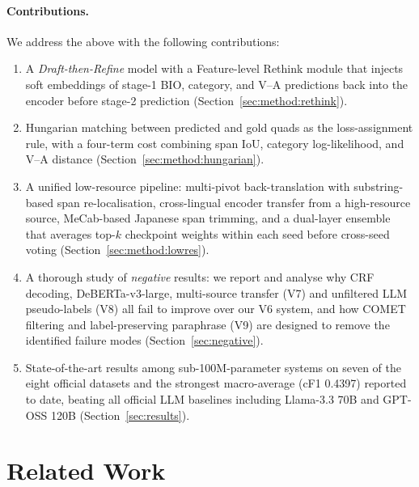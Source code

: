 \documentclass[runningheads]{llncs}
\begin{document}
\paragraph{Contributions.}
We address the above with the following contributions:
\begin{enumerate}[itemsep=2pt,topsep=2pt,leftmargin=*]
  \item A \emph{Draft-then-Refine} model with a Feature-level Rethink
        module that injects soft embeddings of stage-1 BIO,
        category, and V--A predictions back into the encoder before
        stage-2 prediction (Section~\ref{sec:method:rethink}).
  \item Hungarian matching between predicted and gold quads as the
        loss-assignment rule, with a four-term cost combining span
        IoU, category log-likelihood, and V--A distance
        (Section~\ref{sec:method:hungarian}).
  \item A unified low-resource pipeline: multi-pivot back-translation
        with substring-based span re-localisation, cross-lingual
        encoder transfer from a high-resource source, MeCab-based
        Japanese span trimming, and a dual-layer ensemble that
        averages top-$k$ checkpoint weights within each seed before
        cross-seed voting (Section~\ref{sec:method:lowres}).
  \item A thorough study of \emph{negative} results: we report and
        analyse why CRF decoding, DeBERTa-v3-large, multi-source
        transfer (V7) and unfiltered LLM pseudo-labels (V8) all fail
        to improve over our V6 system, and how COMET filtering and
        label-preserving paraphrase (V9) are designed to remove the
        identified failure modes (Section~\ref{sec:negative}).
  \item State-of-the-art results among sub-100M-parameter systems on
        seven of the eight official datasets and the strongest
        macro-average (cF1 0.4397) reported to date, beating all
        official LLM baselines including Llama-3.3 70B and GPT-OSS
        120B (Section~\ref{sec:results}).
\end{enumerate}

\section{Related Work}
\label{sec:related}
\end{document}
